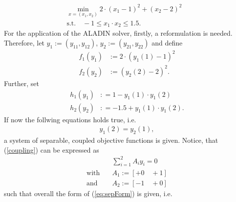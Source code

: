 \documentclass[]{scrartcl}
\begin{document}
\begin{align*}
\min_{x = (x_1, x_2)} 2\cdot (x_1 - 1)^2 + (x_2 - 2)^2 &\\
\text{s.t.} \quad-1 \leq x_1 \cdot x_2 \leq 1.5.&
\end{align*}
For the application of the ALADIN solver, firstly, a reformulation is needed. Therefore, let $y_1 := (y_{11}, y_{12})$, $y_2 := (y_{21}, y_{22})$ and define
\begin{align*}
f_1(y_1) & := 2 \cdot (y_1(1) - 1 )^2 \\
f_2(y_2) & := (y_2(2) - 2)^2.
\end{align*}
Further, set
\begin{align*}
h_1(y_1) & : = 1 - y_1(1) \cdot y_1(2) \\
h_2(y_2) & : = -1.5 + y_1(1) \cdot y_1(2).
\end{align*}
If now the follwing equations holds true, i.e.
\begin{align}\label{coupling}
y_1(2)  = y_2(1),
\end{align}
a system of separable, coupled objective functions is given. Notice, that (\ref{coupling}) can be expressed as
\begin{align*}
&\sum_{i = 1}^2 A_i y_i = 0 \\
\text{with} \quad & A_1 := [+0 \quad +1] \\
\text{and} \quad  & A_2 := [-1 \quad +0]
\end{align*}
such that overall the form of (\ref{eq:sepForm}) is given, i.e.
\end{document}
